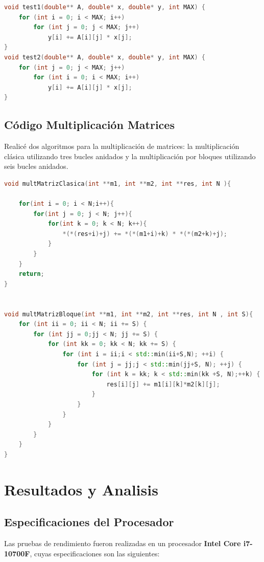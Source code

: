 \documentclass[conference]{IEEEtran}
\begin{document}
\begin{lstlisting}[language=C++]
void test1(double** A, double* x, double* y, int MAX) {
    for (int i = 0; i < MAX; i++)
        for (int j = 0; j < MAX; j++)
            y[i] += A[i][j] * x[j];
}
void test2(double** A, double* x, double* y, int MAX) {
    for (int j = 0; j < MAX; j++)
        for (int i = 0; i < MAX; i++)
            y[i] += A[i][j] * x[j];
}
\end{lstlisting}
\subsection{\textbf{Código Multiplicación Matrices}}
Realicé dos algoritmos para la multiplicación de matrices: la multiplicación clásica utilizando tres bucles anidados y la multiplicación por bloques utilizando seis bucles anidados.
\begin{lstlisting}[language=C++]
void multMatrizClasica(int **m1, int **m2, int **res, int N ){
   
    for(int i = 0; i < N;i++){
        for(int j = 0; j < N; j++){
            for(int k = 0; k < N; k++){
                *(*(res+i)+j) += *(*(m1+i)+k) * *(*(m2+k)+j);
            }
        }
    }
    return;
}


void multMatrizBloque(int **m1, int **m2, int **res, int N , int S){
    for (int ii = 0; ii < N; ii += S) {
        for (int jj = 0;jj < N; jj += S) {
            for (int kk = 0; kk < N; kk += S) {
                for (int i = ii;i < std::min(ii+S,N); ++i) {
                    for (int j = jj;j < std::min(jj+S, N); ++j) {
                        for (int k = kk; k < std::min(kk +S, N);++k) {
                            res[i][j] += m1[i][k]*m2[k][j];
                        }
                    }
                }
            }
        }
    }
}
\end{lstlisting}


\section{Resultados y Analisis}
\subsection{Especificaciones del Procesador}

Las pruebas de rendimiento fueron realizadas en un procesador \textbf{Intel Core i7-10700F}, cuyas especificaciones son las siguientes:
\end{document}
